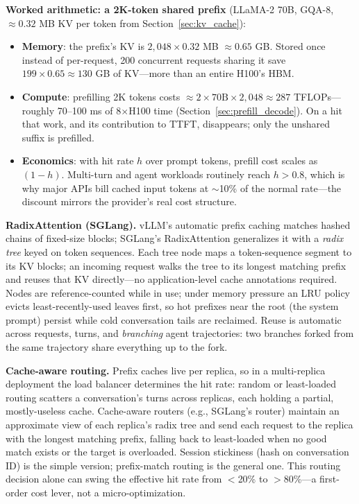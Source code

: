 \textbf{Worked arithmetic: a 2K-token shared prefix} (LLaMA-2 70B, GQA-8, $\approx 0.32$ MB KV per token from Section~\ref{sec:kv_cache}):
\begin{itemize}
    \item \textbf{Memory}: the prefix's KV is $2{,}048 \times 0.32$ MB $\approx 0.65$ GB. Stored once instead of per-request, 200 concurrent requests sharing it save $199 \times 0.65 \approx 130$ GB of KV---more than an entire H100's HBM.
    \item \textbf{Compute}: prefilling 2K tokens costs $\approx 2 \times 70\text{B} \times 2{,}048 \approx 287$ TFLOPs---roughly 70--100 ms of 8$\times$H100 time (Section~\ref{sec:prefill_decode}). On a hit that work, and its contribution to TTFT, disappears; only the unshared suffix is prefilled.
    \item \textbf{Economics}: with hit rate $h$ over prompt tokens, prefill cost scales as $(1-h)$. Multi-turn and agent workloads routinely reach $h > 0.8$, which is why major APIs bill cached input tokens at $\sim$10\% of the normal rate---the discount mirrors the provider's real cost structure.
\end{itemize}

\textbf{RadixAttention (SGLang).} vLLM's automatic prefix caching matches hashed chains of fixed-size blocks; SGLang's RadixAttention generalizes it with a \textit{radix tree} keyed on token sequences. Each tree node maps a token-sequence segment to its KV blocks; an incoming request walks the tree to its longest matching prefix and reuses that KV directly---no application-level cache annotations required. Nodes are reference-counted while in use; under memory pressure an LRU policy evicts least-recently-used leaves first, so hot prefixes near the root (the system prompt) persist while cold conversation tails are reclaimed. Reuse is automatic across requests, turns, and \textit{branching} agent trajectories: two branches forked from the same trajectory share everything up to the fork.

\textbf{Cache-aware routing.} Prefix caches live per replica, so in a multi-replica deployment the load balancer determines the hit rate: random or least-loaded routing scatters a conversation's turns across replicas, each holding a partial, mostly-useless cache. Cache-aware routers (e.g., SGLang's router) maintain an approximate view of each replica's radix tree and send each request to the replica with the longest matching prefix, falling back to least-loaded when no good match exists or the target is overloaded. Session stickiness (hash on conversation ID) is the simple version; prefix-match routing is the general one. This routing decision alone can swing the effective hit rate from $<$20\% to $>$80\%---a first-order cost lever, not a micro-optimization.

